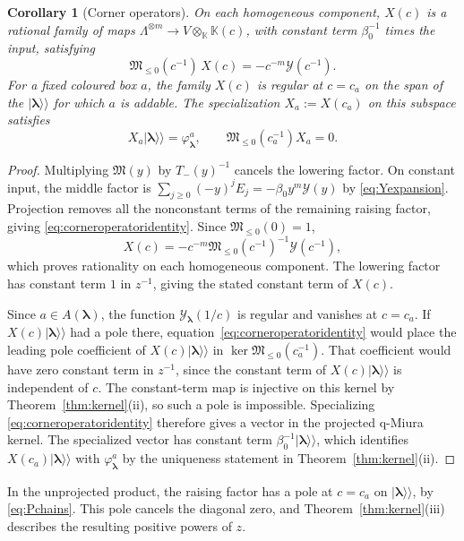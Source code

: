 \documentclass[11pt]{amsart}
\newtheorem{corollary}[theorem]{Corollary}
\theoremstyle{definition}
\theoremstyle{remark}
\newcommand{\K}{\mathbb K}                       %
\newcommand{\betaz}{\beta_0}                     %
\newcommand{\La}{\Lambda}                        %
\newcommand{\bl}{{\boldsymbol{\lambda}}}         %
\newcommand{\Add}[1]{A(#1)}                      %
\newcommand{\CY}{\mathcal Y}
\newcommand{\Yfn}[1]{\CY_{#1}}                   %
\newcommand{\Newton}[1]{E_{#1}}                  %
\newcommand{\ceig}[1]{c_{#1}}                    %
\newcommand{\kket}[1]{\lvert #1\rangle\!\rangle} %
\newcommand{\Miuraop}{\mathfrak M}               %
\newcommand{\Miuraproj}{\Miuraop_{\leq0}}         %
\newcommand{\Meig}[2]{\varphi_{#1}^{#2}}         %
\begin{document}
\begin{corollary}[Corner operators]\label{cor:corneroperator}
On each homogeneous component, \(X(c)\) is a rational family of maps
\(\La^{\otimes m}\to V\otimes_\K\K(c)\), with constant term
\(\betaz^{-1}\) times the input, satisfying
\begin{equation}\label{eq:corneroperatoridentity}
 \Miuraproj(c^{-1})\,X(c)=-c^{-m}\CY(c^{-1}).
\end{equation}
For a fixed coloured box \(a\), the family \(X(c)\) is regular at \(c=\ceig{a}\)
on the span of the \(\kket{\bl}\) for which \(a\) is addable.
The specialization \(X_a:=X(\ceig{a})\) on this subspace satisfies
\[
 X_a\kket{\bl}=\Meig{\bl}{a},
 \qquad
 \Miuraproj(\ceig{a}^{-1})X_a=0.
\]
\end{corollary}

\begin{proof}
Multiplying \(\Miuraop(y)\) by \(T_-(y)^{-1}\) cancels the lowering factor.
On constant input, the middle factor is
\(\sum_{j\geq0}(-y)^j\Newton{j}=-\betaz y^m\CY(y)\) by \eqref{eq:Yexpansion}.
Projection removes all the nonconstant terms of the remaining raising factor,
giving \eqref{eq:corneroperatoridentity}. Since \(\Miuraproj(0)=1\),
\[
 X(c)=-c^{-m}\Miuraproj(c^{-1})^{-1}\CY(c^{-1}),
\]
which proves rationality on each homogeneous component. The lowering factor has
constant term \(1\) in \(z^{-1}\), giving the stated constant term of \(X(c)\).

Since \(a\in\Add{\bl}\), the function \(\Yfn{\bl}(1/c)\) is regular and vanishes
at \(c=\ceig{a}\). If \(X(c)\kket{\bl}\) had a pole there, equation~\eqref{eq:corneroperatoridentity}
would place the leading pole coefficient of \(X(c)\kket{\bl}\) in
\(\ker\Miuraproj(\ceig{a}^{-1})\).
That coefficient would have zero constant term in \(z^{-1}\), since the constant
term of \(X(c)\kket{\bl}\) is independent of \(c\).
The constant-term map is injective on this kernel by Theorem~\ref{thm:kernel}(ii),
so such a pole is impossible. Specializing \eqref{eq:corneroperatoridentity}
therefore gives a vector in the projected q-Miura kernel. The specialized vector has constant term
\(\betaz^{-1}\kket{\bl}\), which identifies \(X(\ceig{a})\kket{\bl}\) with \(\Meig{\bl}{a}\) by the
uniqueness statement in Theorem~\ref{thm:kernel}(ii).
\end{proof}

In the unprojected product, the raising factor has a pole at \(c=\ceig{a}\)
on \(\kket{\bl}\), by \eqref{eq:Pchains}. This pole cancels the diagonal zero,
and Theorem~\ref{thm:kernel}(iii) describes the resulting positive powers of \(z\).
\end{document}
